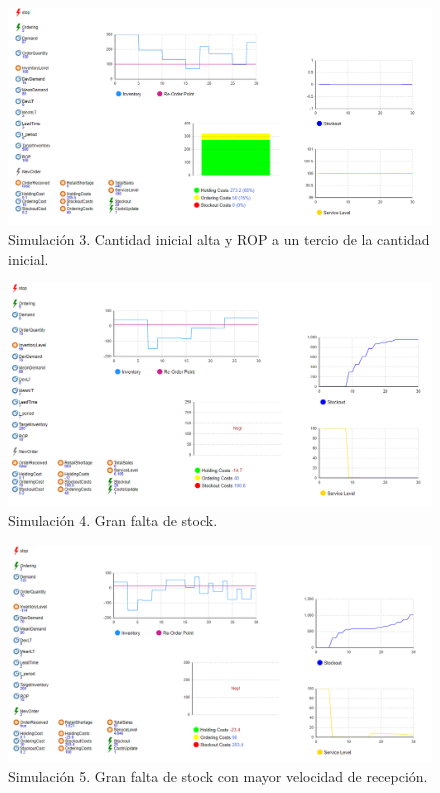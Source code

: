     \begin{figure}[H]
        \includegraphics[width=\linewidth]{images/img3invent}
        \caption{Simulación 3. Cantidad inicial alta y ROP a un tercio de la cantidad inicial.}
    \end{figure}

    \begin{figure}[H]
        \includegraphics[width=\linewidth]{images/img4invent}
        \caption{Simulación 4. Gran falta de stock.}
    \end{figure}

    \begin{figure}[H]
        \includegraphics[width=\linewidth]{images/img5invent}
        \caption{Simulación 5. Gran falta de stock con mayor velocidad de recepción.}
    \end{figure}

